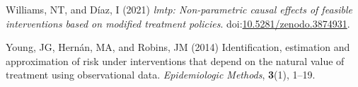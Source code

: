 \documentclass[
  single column]{article}
\newlength{\cslhangindent}
\newenvironment{CSLReferences}[2] %
 {\begin{list}{}{%
  \setlength{\itemindent}{0pt}
  \setlength{\leftmargin}{0pt}
  \setlength{\parsep}{0pt}
  \ifodd #1
   \setlength{\leftmargin}{\cslhangindent}
   \setlength{\itemindent}{-1\cslhangindent}
  \fi
  \setlength{\itemsep}{#2\baselineskip}}}
 {\end{list}}
\begin{document}
\begin{CSLReferences}{1}{0}
Williams, NT, and Díaz, I (2021) \emph{{l}mtp: Non-parametric causal
effects of feasible interventions based on modified treatment policies}.
doi:\href{https://doi.org/10.5281/zenodo.3874931}{10.5281/zenodo.3874931}.

Young, JG, Hernán, MA, and Robins, JM (2014) Identification, estimation
and approximation of risk under interventions that depend on the natural
value of treatment using observational data. \emph{Epidemiologic
Methods}, \textbf{3}(1), 1--19.

\end{CSLReferences}
\end{document}
